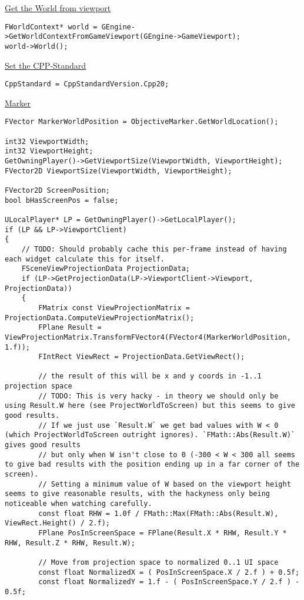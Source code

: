 \uline{Get the World from viewport}
\begin{lstlisting}
FWorldContext* world = GEngine->GetWorldContextFromGameViewport(GEngine->GameViewport);
world->World();
\end{lstlisting}

\uline{Set the CPP-Standard}
\begin{lstlisting}
CppStandard = CppStandardVersion.Cpp20;
\end{lstlisting}


\uline{Marker}
\begin{lstlisting}
FVector MarkerWorldPosition = ObjectiveMarker.GetWorldLocation();

int32 ViewportWidth;
int32 ViewportHeight;
GetOwningPlayer()->GetViewportSize(ViewportWidth, ViewportHeight);
FVector2D ViewportSize(ViewportWidth, ViewportHeight);

FVector2D ScreenPosition;
bool bHasScreenPos = false;

ULocalPlayer* LP = GetOwningPlayer()->GetLocalPlayer();
if (LP && LP->ViewportClient)
{
    // TODO: Should probably cache this per-frame instead of having each widget calculate this for itself.
    FSceneViewProjectionData ProjectionData;
    if (LP->GetProjectionData(LP->ViewportClient->Viewport, ProjectionData))
    {
        FMatrix const ViewProjectionMatrix = ProjectionData.ComputeViewProjectionMatrix();
        FPlane Result = ViewProjectionMatrix.TransformFVector4(FVector4(MarkerWorldPosition, 1.f));
        FIntRect ViewRect = ProjectionData.GetViewRect();

        // the result of this will be x and y coords in -1..1 projection space
        // TODO: This is very hacky - in theory we should only be using Result.W here (see ProjectWorldToScreen) but this seems to give good results.
        // If we just use `Result.W` we get bad values with W < 0 (which ProjectWorldToScreen outright ignores). `FMath::Abs(Result.W)` gives good results
        // but only when W isn't close to 0 (-300 < W < 300 all seems to give bad results with the position ending up in a far corner of the screen).
        // Setting a minimum value of W based on the viewport height seems to give reasonable results, with the hackyness only being noticeable when watching carefully.
        const float RHW = 1.0f / FMath::Max(FMath::Abs(Result.W), ViewRect.Height() / 2.f);
        FPlane PosInScreenSpace = FPlane(Result.X * RHW, Result.Y * RHW, Result.Z * RHW, Result.W);

        // Move from projection space to normalized 0..1 UI space
        const float NormalizedX = ( PosInScreenSpace.X / 2.f ) + 0.5f;
        const float NormalizedY = 1.f - ( PosInScreenSpace.Y / 2.f ) - 0.5f;


\end{lstlisting}
